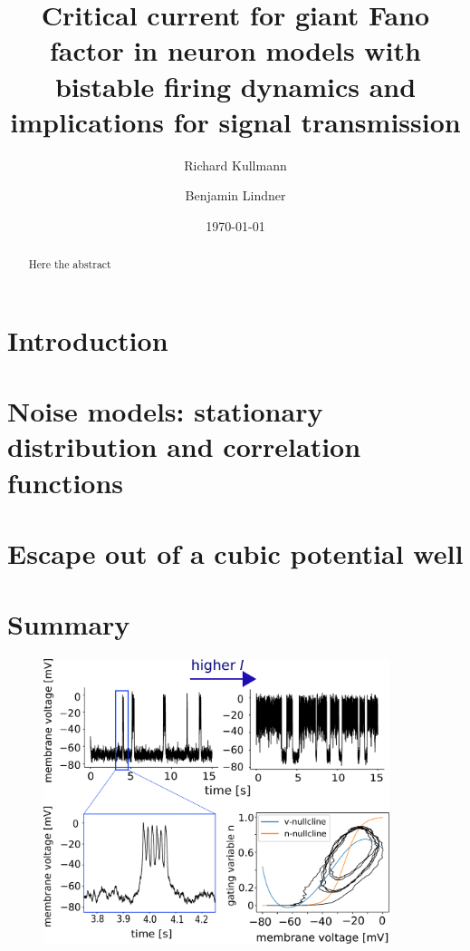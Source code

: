 \documentclass[twocolumn,showpacs,aps,superscriptaddress]{revtex4-1}
\begin{document}
\title{Critical current for giant Fano factor  in neuron models with bistable firing dynamics and implications for signal transmission}

\author{Richard Kullmann}

\author{Benjamin Lindner}
\date{\today}

\begin{abstract}
Here the abstract
\end{abstract}	

\maketitle

\section{Introduction}

\section{Noise models: stationary distribution and correlation functions}

\section{Escape out of a cubic potential well}

\section{Summary}
\onecolumngrid

\begin{figure}[h] 
	\includegraphics[width=0.9\textwidth]{FIGURES/vtmerge.pdf}
	\label{bistability}
\end{figure}    
\twocolumngrid
\end{document}
